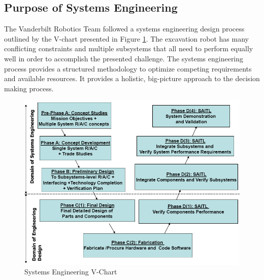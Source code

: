 \documentclass[class=article, crop=false]{standalone}
\begin{document}
	\subsection{Purpose of Systems Engineering}
	\label{subsec:systems_engineering_purpose}
	The Vanderbilt Robotics Team followed a systems engineering design process outlined by the V-chart presented in Figure \ref{fig:safety_protocol_flowsheet}. The excavation robot has many conflicting constraints and multiple subsystems that all need to perform equally well in order to accomplish the presented challenge. The systems engineering process provides a structured methodology to optimize competing requirements and available resources. It provides a holistic, big-picture approach to the decision making process. 
	
	\FloatBarrier
		\begin{figure}[h]
			\centering
			\includegraphics[width=.50\linewidth]{09_Figures/systems_engineering_vee_chart.jpg}
			\caption{Systems Engineering V-Chart}
			\label{fig:safety_protocol_flowsheet}
		\end{figure}
		\FloatBarrier


	
\end{document}
